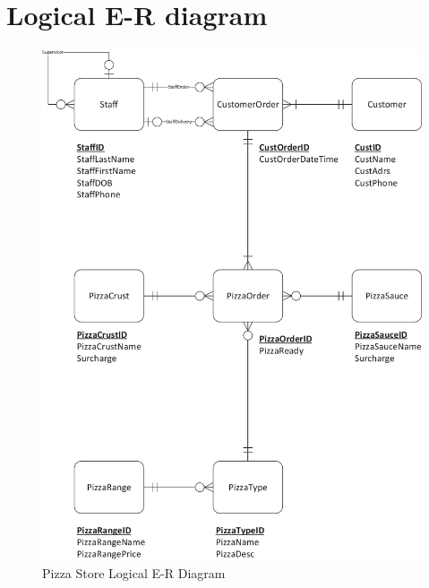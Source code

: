 \newpage
\section{Logical E-R diagram}

\begin{figure}[H]
\centering
\caption{Pizza Store Logical E-R Diagram}
\includegraphics[scale=0.6]{./img/CSG1207_A1_PONCE_TASK_4_ADVLER_PIZZA.pdf}
\end{figure}